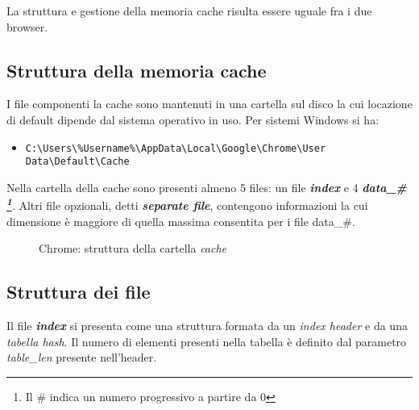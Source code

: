 La struttura e gestione della memoria cache risulta essere uguale fra i due browser.

\subsection{Struttura della memoria cache}

I file componenti la cache sono mantenuti in una cartella sul disco la cui locazione di default dipende dal sistema operativo in uso. Per sistemi Windows si ha: 

\begin{itemize}
	\item{\texttt{C:\textbackslash Users\textbackslash\%Username\%\textbackslash AppData\textbackslash Local\textbackslash Google\textbackslash Chrome\textbackslash User Data\textbackslash Default\textbackslash Cache}}
\end{itemize}

Nella cartella della cache sono presenti almeno 5 files: un file \textbf{\textit{index}} e 4 \textbf{\textit{data\_\# \footnote{Il \# indica un numero progressivo a partire da 0}}}. Altri file opzionali, detti \textbf{\textit{separate file}}, contengono informazioni la cui dimensione è maggiore di quella massima consentita per i file data\_\#.

\begin{figure}[h]
	\centering
	\begin{minipage}[c]{0.7\textwidth}
	\end{minipage}
	\caption{Chrome: struttura della cartella \textit{cache}}
\end{figure}

\subsection{Struttura dei file}
Il file \textbf{\textit{index}} si presenta come una struttura formata da un \textit{index header} e da una \textit{tabella hash}. Il numero di elementi presenti nella tabella è definito dal parametro \textit{table\_len} presente nell'header. 

